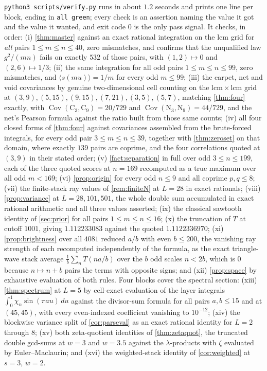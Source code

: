 \documentclass[11pt]{amsart}
\theoremstyle{definition}
\theoremstyle{remark}
\begin{document}
\texttt{python3 scripts/verify.py} runs in about $1.2$ seconds and prints one line per block, ending in \texttt{all green}; every check is an assertion naming the value it got and the value it wanted, and exit code $0$ is the only pass signal. It checks, in order: (i) \cref{thm:master} against an exact rational integration on the $\mathrm{lcm}$ grid for \emph{all} pairs $1\le m\le n\le40$, zero mismatches, and confirms that the unqualified law $g^2/(mn)$ fails on exactly $532$ of those pairs, with $(1,2)\mapsto0$ and $(2,6)\mapsto1/3$; (ii) the same integration for all odd pairs $1\le m\le n\le99$, zero mismatches, and $\langle s(mu)\rangle=1/m$ for every odd $m\le99$; (iii) the carpet, net and void covariances by genuine two-dimensional cell counting on the $\mathrm{lcm}\times\mathrm{lcm}$ grid at $(3,9),(5,15),(9,15),(7,21),(3,5),(5,7)$, matching \cref{thm:four} exactly, with $\operatorname{Cov}(\mathrm{C}_3,\mathrm{C}_9)=20/729$ and $\operatorname{Cov}(\mathrm{N}_3,\mathrm{N}_9)=44/729$, and the net's Pearson formula against the ratio built from those same counts; (iv) all four closed forms of \cref{thm:four} against covariances assembled from the brute-forced integrals, for every odd pair $3\le m\le n\le39$, together with \cref{thm:zeroset} on that domain, where exactly $139$ pairs are coprime, and the four correlations quoted at $(3,9)$ in their stated order; (v) \cref{fact:separation} in full over odd $3\le n\le199$, each of the three quoted scores at $n=169$ recomputed as a true maximum over all odd $m<169$; (vi) \cref{prop:origin} for every odd $n\le9$ and all coprime $p,q\le8$; (vii) the finite-stack ray values of \cref{rem:finiteN} at $L=28$ in exact rationals; (viii) \cref{prop:variance} at $L=28,101,501$, the whole double sum accumulated in exact rational arithmetic and all three values asserted; (ix) the classical sawtooth identity of \cref{sec:prior} for all pairs $1\le m\le n\le16$; (x) the truncation of $T$ at cutoff $1001$, giving $1.112233083$ against the quoted $1.1122336970$; (xi) \cref{prop:brightness} over all $4081$ reduced $a/b$ with even $b\le200$, the vanishing ray strength of each recomputed independently of the formula, as the exact triangle-wave stack average $\frac1b\sum_{n}T(na/b)$ over the $b$ odd scales $n<2b$, which is $0$ because $n\mapsto n+b$ pairs the terms with opposite signs; and (xii) \cref{prop:space} by exhaustive evaluation of both rules. Four blocks cover the spectral section: (xiii) \cref{thm:spectrum} at $L = 5$ by cell-exact evaluation of the layer integrals $\int_0^1 \chi_n \sin(\pi a u)\, du$ against the divisor-sum formula for all pairs $a, b \le 15$ and at $(45,45)$, with every even-indexed coefficient vanishing to $10^{-12}$; (xiv) the blockwise variance split of \cref{cor:parseval} as an exact rational identity for $L = 2$ through $8$; (xv) both zeta-quotient identities of \cref{thm:zetaquot}, the truncated double gcd-sums at $w = 3$ and $w = 3.5$ against the $\lambda$-products with $\zeta$ evaluated by Euler--Maclaurin; and (xvi) the weighted-stack identity of \cref{cor:weighted} at $s = 3$, $w = 2$.
\end{document}
